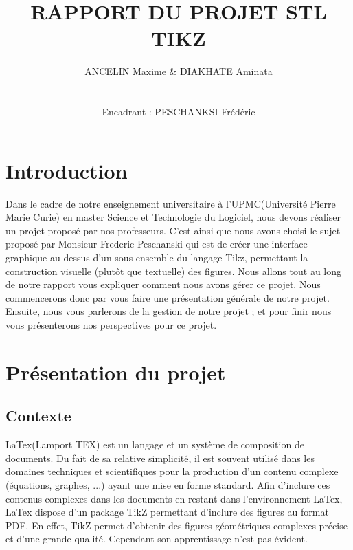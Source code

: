 \documentclass[a4paper]{report}
\title{RAPPORT DU PROJET STL \\ TIKZ}
\author{ANCELIN Maxime & DIAKHATE Aminata \\ \\ \\ Encadrant : PESCHANKSI Frédéric}
\begin{document}
\titleformat{\chapter}[hang]{\bf\huge}{\thechapter}{2pc}{} 

\maketitle
\tableofcontents
\newpage


 \newpage
 \chapter{Introduction}
  Dans le cadre de notre enseignement universitaire à l'UPMC(Université Pierre Marie Curie) en master Science et Technologie du Logiciel, nous devons réaliser un projet proposé par nos professeurs. C'est ainsi que nous avons choisi le sujet proposé par Monsieur Frederic Peschanski qui est de créer une interface graphique au dessus d'un sous-ensemble du langage Tikz, permettant la construction visuelle (plutôt que textuelle) des figures. 
  \newline
  Nous allons tout au long de notre rapport vous expliquer comment nous avons gérer ce projet. Nous commencerons donc par vous faire une présentation générale de notre projet. Ensuite, nous vous parlerons de la gestion de notre projet ; et pour finir nous vous présenterons nos perspectives pour ce projet.
  
  \chapter{Présentation du projet}
  \section{Contexte}
  LaTex(Lamport TEX) est un langage et un système de composition de documents. Du fait de sa relative simplicité, il est souvent utilisé dans les domaines techniques et scientifiques pour la production d'un contenu complexe (équations, graphes, ...) ayant une mise en forme standard. Afin d'inclure ces contenus complexes dans les documents en restant dans l'environnement LaTex, LaTex dispose d'un package TikZ permettant d'inclure des figures au format PDF. En effet, TikZ permet d'obtenir des figures géométriques complexes précise et d'une grande qualité. Cependant son apprentissage n'est pas évident. 
\end{document}
